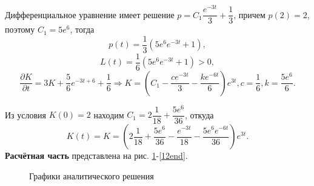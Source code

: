 \documentclass[a4paper, 12pt]{article}
\newcommand{\df}[2]{\frac{\partial #1}{\partial #2}}
\begin{document}
Дифференциальное уравнение имеет решение $p=C_1 \dfrac{e^{-3t}}{3} +\dfrac{1}{3}$, причем $p(2)=2$, поэтому $C_1=5 e^{6}$, тогда
\begin{equation}
    p(t)=\dfrac{1}{3}\left(5e^{6} e^{-3t}+1 \right) ,
\end{equation}
\begin{equation}
    L(t)=\dfrac{1}{6}\left(5e^{6} e^{-3t}+1 \right)>0,
\end{equation}
\begin{equation}
    \df{K}{t}=3K+\dfrac{5}{6} e^{-3t+6}+\dfrac{1}{6} \Rightarrow K=\left(C_1- \dfrac{c e^{-3t}}{3}- \dfrac{k e^{-6t}}{6}\right) e^{3t},c=\dfrac{1}{6},k=\dfrac{5 e^{6}}{6}.
\end{equation}

Из условия $K(0)=2$ находим $C_1=2\dfrac{1}{18}+\dfrac{5 e^{6}}{36}$, откуда 
\begin{equation}
    K(t)=K=\left(2\dfrac{1}{18}+\dfrac{5 e^{6}}{36}- \dfrac{e^{-3t}}{18}-\dfrac{5 e^{6} e^{-6t}}{36}\right) e^{3t}.
\end{equation}
{\bf Расчётная часть} представлена на рис. \ref{12beg}-\ref{12end}.
\begin{figure}[h]
    \noindent{}
    \caption{Графики аналитического решения}
    \label{12beg}
\end{figure}
\end{document}
